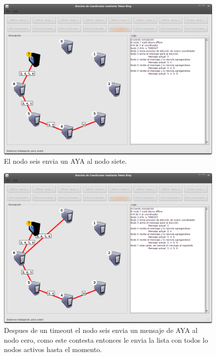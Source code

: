 \begin{figure}
\centering
 \includegraphics[scale=0.4,keepaspectratio=true]{./imagenes/tokenRing/token3.png}
 \caption{El nodo seis envia un AYA al nodo siete.}
\end{figure}

\begin{figure}
\centering
 \includegraphics[scale=0.4,keepaspectratio=true]{./imagenes/tokenRing/token4.png}
 \caption{Despues de un timeout el nodo seis envia un mensaje de AYA al nodo cero, como este contesta entonces le envia la lista con todos lo nodos activos hasta el momento.}
\end{figure}

